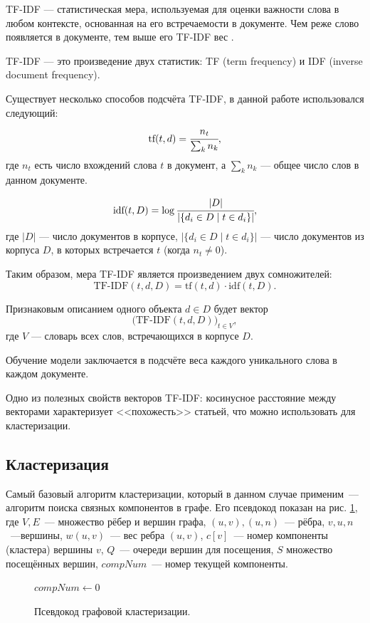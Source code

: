 \documentclass[a4paper, 14pt]{extarticle}
\begin{document}
TF-IDF --- статистическая мера, используемая для оценки важности слова в любом контексте, основанная на его встречаемости в документе. Чем реже слово появляется в документе, тем выше его TF-IDF вес \cite{doi:10.1108/eb026526}.

TF-IDF --- это произведение двух статистик: TF (term frequency) и IDF (inverse 
document frequency). 

Существует несколько способов подсчёта TF-IDF, в данной работе использовался следующий:
$$
\text{tf}(t, d) = \cfrac{n_t}{\sum_{k} n_k},
$$
где $n_{t}$ есть число вхождений слова $t$ в документ, а $\sum_{k} n_k$ --- общее число слов в данном документе.

$$
\text{idf}(t, D) = \log{ \cfrac{|D|}{|\{ d_i \in D \mid t \in d_i \}|}},
$$
где $|D|$ --- число документов в корпусе, $|\{ d_i \in D \mid t \in d_i \}|$ — число документов из корпуса $D$, в которых встречается 
$t$ (когда $n_{t} \neq 0$).

Таким образом, мера TF-IDF является произведением двух сомножителей:
$$
\text{TF-IDF}(t, d, D) = \text{tf}(t, d) \cdot \text{idf}(t, D).
$$

Признаковым описанием одного объекта $d \in D$ будет вектор
$$
\big(\text{TF-IDF}(t,d,D)\big)_{t\in V},
$$
где $V$ --- словарь всех слов, встречающихся в корпусе $D$.

Обучение модели заключается в подсчёте веса каждого уникального слова в каждом документе.

Одно из полезных свойств векторов TF-IDF: косинусное расстояние между векторами характеризует <<похожесть>> статьей, что можно использовать для кластеризации.

\subsection{Кластеризация}
Самый базовый алгоритм кластеризации, который в данном случае применим~--- алгоритм поиска связных компонентов в графе. Его псевдокод показан на рис. \ref{pseudo}, где $V, E$~--- множество рёбер и вершин графа, $(u,v),(u,n)$~--- рёбра, $v,u,n$~---вершины, 
$w(u,v)$~--- вес ребра $(u,v)$, $c[v]$~--- номер компоненты (кластера) вершины $v$, $Q$~--- очереди вершин для посещения, $S$ множество посещённых вершин, $compNum$~--- номер текущей компоненты.

\begin{figure}
	\begin{algorithm}[H]
		\DontPrintSemicolon
		$ compNum \gets 0 $\;
	\end{algorithm}
	\caption{Псевдокод графовой кластеризации.}
	\label{pseudo}
\end{figure}
\end{document}
